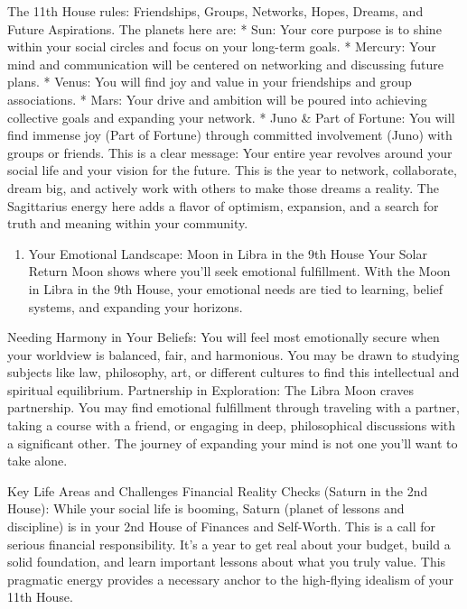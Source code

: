 \documentclass{article}
\begin{document}
The 11th House rules: Friendships, Groups, Networks, Hopes, Dreams, and
Future Aspirations. The planets here are: * Sun: Your core purpose is to
shine within your social circles and focus on your long-term goals. *
Mercury: Your mind and communication will be centered on networking and
discussing future plans. * Venus: You will find joy and value in your
friendships and group associations. * Mars: Your drive and ambition will
be poured into achieving collective goals and expanding your network. *
Juno \& Part of Fortune: You will find immense joy (Part of Fortune)
through committed involvement (Juno) with groups or friends. This is a
clear message: Your entire year revolves around your social life and
your vision for the future. This is the year to network, collaborate,
dream big, and actively work with others to make those dreams a reality.
The Sagittarius energy here adds a flavor of optimism, expansion, and a
search for truth and meaning within your community.

\begin{enumerate}
\def\labelenumi{\arabic{enumi}.}
\setcounter{enumi}{2}
\tightlist
\item
  Your Emotional Landscape: Moon in Libra in the 9th House Your Solar
  Return Moon shows where you'll seek emotional fulfillment. With the
  Moon in Libra in the 9th House, your emotional needs are tied to
  learning, belief systems, and expanding your horizons.
\end{enumerate}

Needing Harmony in Your Beliefs: You will feel most emotionally secure
when your worldview is balanced, fair, and harmonious. You may be drawn
to studying subjects like law, philosophy, art, or different cultures to
find this intellectual and spiritual equilibrium. Partnership in
Exploration: The Libra Moon craves partnership. You may find emotional
fulfillment through traveling with a partner, taking a course with a
friend, or engaging in deep, philosophical discussions with a
significant other. The journey of expanding your mind is not one you'll
want to take alone.

Key Life Areas and Challenges Financial Reality Checks (Saturn in the
2nd House): While your social life is booming, Saturn (planet of lessons
and discipline) is in your 2nd House of Finances and Self-Worth. This is
a call for serious financial responsibility. It's a year to get real
about your budget, build a solid foundation, and learn important lessons
about what you truly value. This pragmatic energy provides a necessary
anchor to the high-flying idealism of your 11th House.
\end{document}
